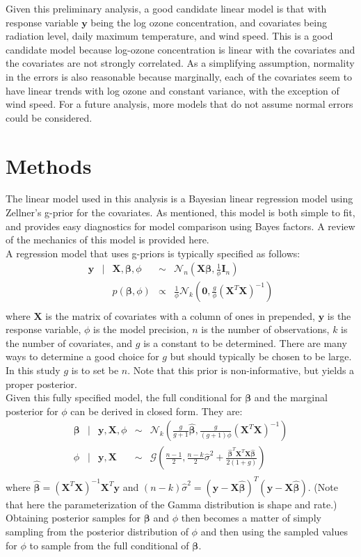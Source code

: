 \documentclass{../../tex_template/asaproc}
\newcommand{\p}[1]{\left(#1\right)}
\newcommand{\y}{\bm y}
\newcommand{\X}{\bm X}
\newcommand{\Xb}{\bm {X\beta}}
\newcommand{\bh}{\bm{\hat\beta}}
\newcommand{\XXi}{(\X^T\X)^{-1}}
\begin{document}
Given this preliminary analysis, a good candidate linear model is that with
response variable $\y$ being the log ozone concentration, and covariates being
radiation level, daily maximum temperature, and wind speed. This is a good
candidate model because log-ozone concentration is linear with the covariates
and the covariates are not strongly correlated. As a simplifying assumption,
normality in the errors is also reasonable because marginally, each of the
covariates seem to have linear trends with log ozone and constant variance,
with the exception of wind speed. For a future analysis, more models that do
not assume normal errors could be considered.

\section{Methods}
The linear model used in this analysis is a Bayesian linear regression model
using Zellner's g-prior for the covariates. As mentioned, this model is both
simple to fit, and provides easy diagnostics for model comparison using 
Bayes factors. A review of the mechanics of this model is provided here.\\

A regression model that uses g-priors is typically specified as follows:
\[
  \begin{array}{rclcl}
    \y &|& \X,\bm\beta,\phi &\sim& \mathcal{N}_n\p{\Xb,\frac{1}{\phi}\bm I_n} \\
       && p(\bm\beta,\phi) &\propto& \frac{1}{\phi} \mathcal{N}_k (\bm 0, \frac{g}{\phi} (\X^T\X)^{-1})\\
  \end{array}
\]
where $\X$ is the matrix of covariates with a column of ones in prepended, $\y$
is the response variable, $\phi$ is the model precision, $n$ is the number of
observations, $k$ is the number of covariates, and $g$ is a constant to be
determined. There are many ways to determine a good choice for $g$ but should
typically be chosen to be large. In this study $g$ is to set be $n$. Note that
this prior is non-informative, but yields a proper posterior. \\

Given this fully specified model, the full conditional for $\bm\beta$ and
the marginal posterior for $\phi$ can be derived in closed form. They are:
\[
  \begin{array}{rclcl}
    \bm\beta &|& \y,\X,\phi &\sim& \mathcal{N}_k\p{\frac{g}{g+1}\bh, \frac{g}{(g+1)\phi} \XXi}\\
    \phi &|& \y,\X &\sim& \mathcal{G}\p{\frac{n-1}{2},\frac{n-k}{2}\hat\sigma^2+\frac{\bh^T\X^T\X\bh}{2(1+g)}}\\
  \end{array}
\]
where $\bh = \XXi\X^T\y$ and $(n-k) \hat\sigma^2 = (\y-\X\bh)^T(\y-\X\bh)$. 
(Note that here the parameterization of the Gamma distribution is shape and
rate.) Obtaining posterior samples for $\bm\beta$ and $\phi$ then becomes a
matter of simply sampling from the posterior distribution of $\phi$ and then
using the sampled values for $\phi$ to sample from the full conditional of 
$\bm\beta$. \\
\end{document}
